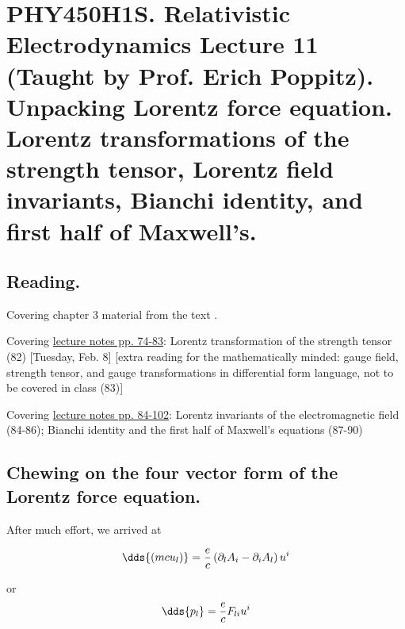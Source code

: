 
%

\chapter{PHY450H1S.  Relativistic Electrodynamics Lecture 11 (Taught by Prof. Erich Poppitz).  Unpacking Lorentz force equation.  Lorentz transformations of the strength tensor, Lorentz field invariants, Bianchi identity, and first half of Maxwell's.}
\label{chap:relativisticElectrodynamicsL11}
{}
\date{Feb 9, 2011}

\beginArtWithToc

\section{Reading.}

Covering chapter 3 material from the text \cite{landau1980classical}.

Covering \href{http://www.physics.utoronto.ca/~poppitz/e-poppitz/PHY450_files/RelEMpp74-83.pdf}{lecture notes pp. 74-83}: Lorentz transformation of the strength tensor (82) [Tuesday, Feb. 8] [extra reading for the mathematically minded: gauge field, strength tensor, and gauge transformations in differential form language, not to be covered in class (83)] 

Covering \href{http://www.physics.utoronto.ca/~poppitz/e-poppitz/PHY450_files/RelEMpp84-102.pdf}{lecture notes pp. 84-102}: Lorentz invariants of the electromagnetic field (84-86); Bianchi identity and the first half of Maxwell's equations (87-90)

\section{Chewing on the four vector form of the Lorentz force equation.}

After much effort, we arrived at 

\begin{equation}\label{eqn:relativisticElectrodynamicsL11:10}
\dds{(m c u_l) } = \frac{e}{c} \left( \partial_l A_i - \partial_i A_l \right) u^i
\end{equation}

or
\begin{equation}\label{eqn:relativisticElectrodynamicsL11:30}
\dds{ p_l } = \frac{e}{c} F_{li} u^i
\end{equation}

